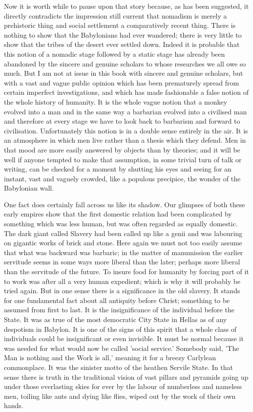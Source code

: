 Now it is worth while to pause upon that story because, as has been suggested, it directly contradicts the impression still current that nomadism is merely a prehistoric thing and social settlement a comparatively recent thing. There is nothing to show that the Babylonians had ever wandered; there is very little to show that the tribes of the desert ever settled down. Indeed it is probable that this notion of a nomadic stage followed by a static stage has already been abandoned by the sincere and genuine scholars to whose researches we all owe so much. But I am not at issue in this book with sincere and genuine scholars, but with a vast and vague public opinion which has been prematurely spread from certain imperfect investigations, and which has made fashionable a false notion of the whole history of humanity. It is the whole vague notion that a monkey evolved into a man and in the same way a barbarian evolved into a civilised man and therefore at every stage we have to look back to barbarism and forward to civilisation. Unfortunately this notion is in a double sense entirely in the air. It is an atmosphere in which men live rather than a thesis which they defend. Men in that mood are more easily answered by objects than by theories; and it will be well if anyone tempted to make that assumption, in some trivial turn of talk or writing, can be checked for a moment by shutting his eyes and seeing for an instant, vast and vaguely crowded, like a populous precipice, the wonder of the Babylonian wall.

One fact does certainly fall across us like its shadow. Our glimpses of both these early empires show that the first domestic relation had been complicated by something which was less human, but was often regarded as equally domestic. The dark giant called Slavery had been called up like a genii and was labouring on gigantic works of brick and stone. Here again we must not too easily assume that what was backward was barbaric; in the matter of manumission the earlier servitude seems in some ways more liberal than the later; perhaps more liberal than the servitude of the future. To insure food for humanity by forcing part of it to work was after all a very human expedient; which is why it will probably be tried again. But in one sense there is a significance in the old slavery. It stands for one fundamental fact about all antiquity before Christ; something to be assumed from first to last. It is the insignificance of the individual before the State. It was as true of the most democratic City State in Hellas as of any despotism in Babylon. It is one of the signs of this spirit that a whole class of individuals could be insignificant or even invisible. It must be normal because it was needed for what would now be called 'social service.' Somebody said, 'The Man is nothing and the Work is all,' meaning it for a breezy Carlylean commonplace. It was the sinister motto of the heathen Servile State. In that sense there is truth in the traditional vision of vast pillars and pyramids going up under those everlasting skies for ever by the labour of numberless and nameless men, toiling like ants and dying like flies, wiped out by the work of their own hands.


